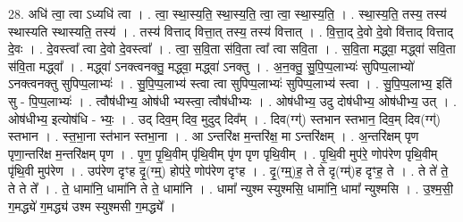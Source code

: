 \documentclass[17pt]{extarticle}
\begin{document}
28. अधि॑ त्वा॒ त्वा ऽध्यधि॑ त्वा । . त्वा॒ स्था॒स्य॒ति॒ स्था॒स्य॒ति॒ त्वा॒ त्वा॒ स्था॒स्य॒ति॒ । . स्था॒स्य॒ति॒ तस्य॒ तस्य॑ स्थास्यति स्थास्यति॒ तस्य॑ । . तस्य॑ वित्ताद् वित्ता॒त् तस्य॒ तस्य॑ वित्तात् । . वि॒त्ता॒द् दे॒वो दे॒वो वि॑त्ताद् वित्ताद् दे॒वः । . दे॒वस्त्वा᳚ त्वा दे॒वो दे॒वस्त्वा᳚ । . त्वा॒ स॒वि॒ता स॑वि॒ता त्वा᳚ त्वा सवि॒ता । . स॒वि॒ता मद्ध्वा॒ मद्ध्वा॑ सवि॒ता स॑वि॒ता मद्ध्वा᳚ । . मद्ध्वा॑ ऽनक्त्वनक्तु॒ मद्ध्वा॒ मद्ध्वा॑ ऽनक्तु । . अ॒न॒क्तु॒ सु॒पि॒प्प॒लाभ्यः॑ सुपिप्प॒लाभ्यो॑ ऽनक्त्वनक्तु सुपिप्प॒लाभ्यः॑ । . सु॒पि॒प्प॒लाभ्य॑ स्त्वा त्वा सुपिप्प॒लाभ्यः॑ सुपिप्प॒लाभ्य॑ स्त्वा । . सु॒पि॒प्प॒लाभ्य॒ इति॑ सु - पि॒प्प॒लाभ्यः॑ । . त्वौष॑धीभ्य॒ ओष॑धी भ्यस्त्वा॒ त्वौष॑धीभ्यः । . ओष॑धीभ्य॒ उदु दोष॑धीभ्य॒ ओष॑धीभ्य॒ उत् । . ओष॑धीभ्य॒ इत्योष॑धि - भ्यः॒ । . उद् दिव॒म् दिव॒ मुदुद् दिव᳚म् । . दिव(ग्ग्॑) स्तभान स्तभान॒ दिव॒म् दिव(ग्ग्॑) स्तभान । . स्त॒भा॒ना स्त॑भान स्तभा॒ना । . आ ऽन्तरि॑क्ष म॒न्तरि॑क्ष॒ मा ऽन्तरि॑क्षम् । . अ॒न्तरि॑क्षम् पृण पृणा॒न्तरि॑क्ष म॒न्तरि॑क्षम् पृण । . पृ॒ण॒ पृ॒थि॒वीम् पृ॑थि॒वीम् पृ॑ण पृण पृथि॒वीम् । . पृ॒थि॒वी मुप॑रे॒ णोप॑रेण पृथि॒वीम् पृ॑थि॒वी मुप॑रेण । . उप॑रेण दृꣳह दृ॒(ग्म्॒) होप॑रे॒ णोप॑रेण दृꣳह । . दृ॒(ग्म्॒)ह॒ ते ते दृ(ग्म्॑)ह दृꣳह॒ ते । . ते ते॑ ते॒ ते ते ते᳚ । . ते॒ धामा॑नि॒ धामा॑नि ते ते॒ धामा॑नि । . धामा᳚ न्युश्म स्युश्मसि॒ धामा॑नि॒ धामा᳚ न्युश्मसि । . उ॒श्म॒सी॒ ग॒मद्ध्ये॑ ग॒मद्ध्य॑ उश्म स्युश्मसी ग॒मद्ध्ये᳚ । \newline
\end{document}
